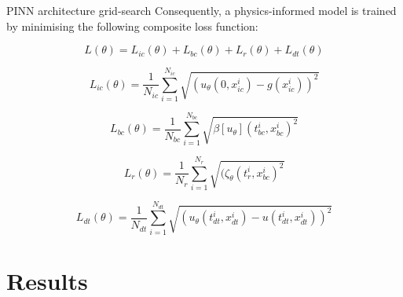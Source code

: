 \documentclass[serif,8pt, aspectratio=169]{beamer}
\begin{document}
\begin{frame}[fragile]{PINN architecture grid-search}
    Consequently, a physics-informed model is trained by minimising the following composite loss function:
    
    \begin{equation}
       \textit{L}(\theta ) = \textit{L}_{ic}(\theta )+\textit{L}_{bc}(\theta )+\textit{L}_{r}(\theta )+\textit{L}_{dt}(\theta )
    \end{equation}
    
    \begin{equation}
        \textit{L}_{ic}(\theta )=\frac{1}{N_{ic}}\sum^{N_{ic}}_{i=1}\sqrt{(u_\theta(0,x_{ic}^i)-g(x_{ic}^i))^2}
    \end{equation}

    \begin{equation}
        \textit{L}_{bc}(\theta )=\frac{1}{N_{bc}}\sum^{N_{bc}}_{i=1}\sqrt{\beta[u_\theta](t^{i}_{bc},x^i_{bc})^2}
    \end{equation}

    \begin{equation}
        \textit{L}_{r}(\theta )=\frac{1}{N_{r}}\sum^{N_{r}}_{i=1}\sqrt{(\zeta_\theta(t^i_{r},x^i_{bc})^2}
    \end{equation}

    \begin{equation}
        \textit{L}_{dt}(\theta )=\frac{1}{N_{dt}}\sum^{N_{dt}}_{i=1}\sqrt{(u_\theta(t^i_{dt},x_{dt}^i)-u(t^i_{dt},x_{dt}^i))^2}
    \end{equation}

\end{frame}


\section{Results}
\end{document}
